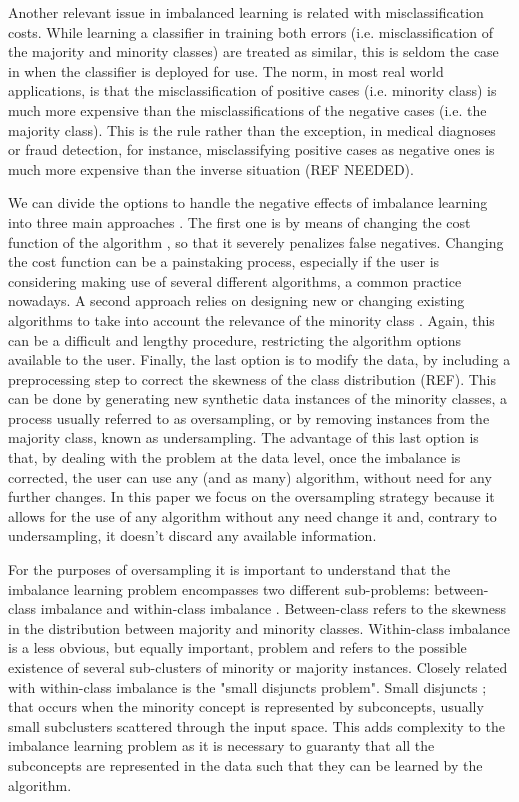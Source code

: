 \documentclass[parskip=full]{scrartcl}
\begin{document}
Another relevant issue in imbalanced learning is related with misclassification
costs. While learning a classifier in training both errors (i.e.
misclassification of the majority and minority classes) are treated as similar,
this is seldom the case in when the classifier is  deployed for use. The norm,
in most real world applications, is that the misclassification of positive cases
(i.e. minority class) is much more expensive than the misclassifications of the
negative cases (i.e. the majority class). This is the rule rather than the
exception, in medical diagnoses or fraud detection, for instance, misclassifying
positive cases as negative ones is much more expensive than the inverse
situation (REF NEEDED).

We can divide the options to handle the negative effects of imbalance learning
into three main approaches \cite{Fernandez2013}. The first one is by means of
changing the cost function of the algorithm \cite{Wu2005}, so that it severely
penalizes false negatives. Changing the cost function can be a painstaking
process, especially if the user is considering making use of several different
algorithms, a common practice nowadays. A second approach relies on designing
new or changing existing algorithms to take into account the relevance of the
minority class \cite{Chawla2008}. Again, this can be a difficult and lengthy
procedure, restricting the algorithm options available to the user. Finally, the
last option is to modify the data, by including a preprocessing step to correct
the skewness of the class distribution (REF). This can be done by generating new
synthetic data instances of the minority classes, a process usually referred to
as oversampling, or by removing instances from the majority class, known as
undersampling. The advantage of this last option is that, by dealing with the
problem at the data level, once the imbalance is corrected, the user can use any
(and as many) algorithm, without need for any further changes. In this paper we
focus on the oversampling strategy because it allows for the use of any
algorithm without any need change it and, contrary to undersampling, it doesn’t
discard any available information.

For the purposes of oversampling it is important to understand that the
imbalance learning problem encompasses two different sub-problems: between-class
imbalance and within-class imbalance \cite{Jo2004}. Between-class refers to the
skewness in the distribution between majority and minority classes. Within-class
imbalance is a less obvious, but equally important, problem and refers to the
possible existence of several sub-clusters of minority or majority instances.
Closely related with within-class imbalance is the "small disjuncts problem".
Small disjuncts \cite{Galar2012}; \cite{Weiss2003} that occurs when the minority
concept is represented by subconcepts, usually small subclusters scattered
through the input space. This adds complexity to the imbalance learning problem
as it is necessary to guaranty that all the subconcepts are represented in the
data such that they can be learned by the algorithm.
\end{document}
